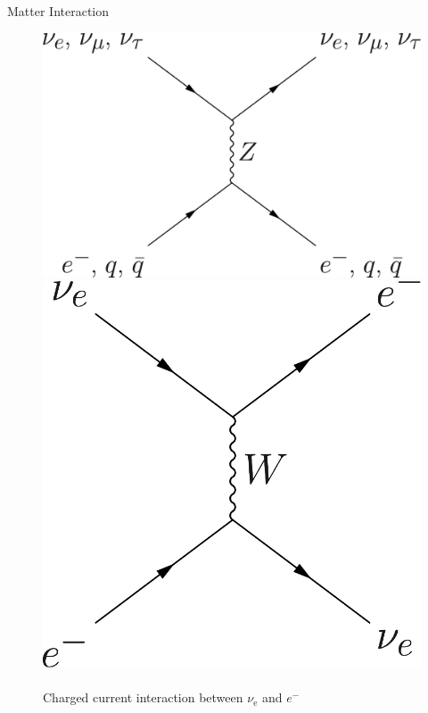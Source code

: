 \documentclass[9pt]{beamer}
\begin{document}
\begin{darkframes}
\begin{frame}{Matter Interaction}
\begin{tcolorbox}
\begin{figure}[ht]
\centering
\begin{minipage}[b]{0.45\linewidth}
\centering
\includegraphics[height=0.32\textheight]{assets/neutral-current.png}
\caption*{\color{black}Neutral current interaction between $\nu_{\mathrm e}$, $\nu_{\mu}$, $\nu_{\tau}$, \\
and $e^{-}$, quarks and antiquarks.}
\end{minipage}%
\begin{minipage}[b]{0.45\linewidth}
\centering
\includegraphics[height=0.32\textheight]{assets/charged-current.png}
\caption*{\\
\color{black}Charged current interaction between $\nu_{\mathrm e}$ and $e^{-}$}
\end{minipage}
\end{figure}


\end{tcolorbox}
\end{frame}
\end{darkframes}
\end{document}
